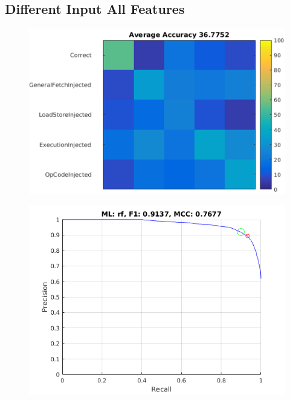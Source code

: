 \documentclass{sig-alternate}
\begin{document}
\subsection{Different Input All Features}

\begin{figure}[t]
\begin{center}
   \includegraphics[width=0.95\linewidth]{./figures/diaf_multi.png}
\end{center}
   \caption{}
\label{fig:diaf-multi}
\end{figure}

\begin{figure}[t]
\begin{center}
   \includegraphics[width=0.95\linewidth]{./figures/disf.png}
\end{center}
   \caption{}
\label{fig:disf}
\end{figure}
\end{document}
